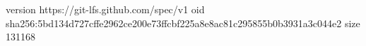 version https://git-lfs.github.com/spec/v1
oid sha256:5bd134d727cffe2962ce200e73ffcbf225a8e8ac81c295855b0b3931a3c044e2
size 131168

